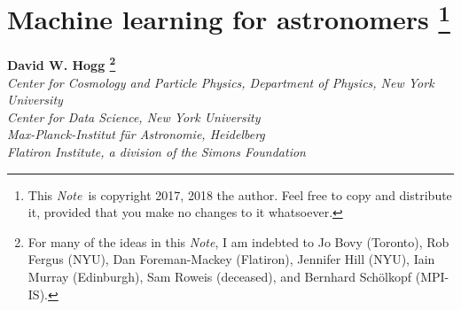 \documentclass[12pt, twoside, letterpaper]{article}
\newcommand{\thistitle}{Machine learning for astronomers}
\newcommand{\documentname}{\textsl{Note}}
\begin{document}
\sloppy\sloppypar\raggedbottom\frenchspacing\thispagestyle{empty} %

\section*{\thistitle%
\footnote{This \documentname\ is copyright 2017, 2018 the author. Feel free to copy and
distribute it, provided that you make no changes to it whatsoever.}}

\noindent
\textbf{David W. Hogg%
\footnote{For many of the ideas in this \documentname, I am indebted to
  Jo Bovy (Toronto),
  Rob Fergus (NYU),
  Dan Foreman-Mackey (Flatiron),
  Jennifer Hill (NYU),
  Iain Murray (Edinburgh),
  Sam Roweis (deceased),
  and
  Bernhard Sch\"olkopf (MPI-IS).}}\\
\textsl{\footnotesize
  Center for Cosmology and Particle Physics, Department of Physics, New York University \\
  Center for Data Science, New York University \\
  Max-Planck-Institut f\"ur Astronomie, Heidelberg \\
  Flatiron Institute, a division of the Simons Foundation}
\end{document}
